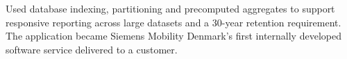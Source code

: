 Used database indexing, partitioning and precomputed aggregates to support responsive reporting across large datasets and a 30-year retention requirement. The application became Siemens Mobility Denmark's first internally developed software service delivered to a customer.
